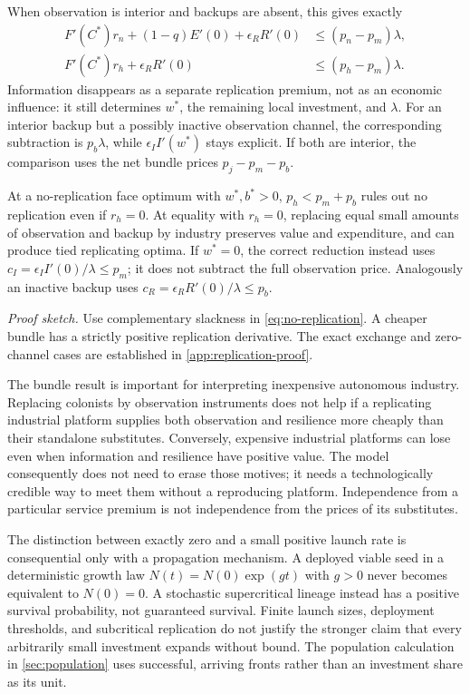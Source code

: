 When observation is interior and backups are absent, this gives exactly
\begin{align}
 F'(C^*)r_n+(1-q)E'(0)+\epsilon_RR'(0)&\leq(p_n-p_m)\lambda,\nonumber\\
 F'(C^*)r_h+\epsilon_RR'(0)&\leq(p_h-p_m)\lambda.
 \label{eq:observation-net}
\end{align}
Information disappears as a separate replication premium, not as an
economic influence: it still determines $w^*$, the remaining local
investment, and $\lambda$. For an interior backup but a possibly inactive
observation channel, the corresponding subtraction is $p_b\lambda$, while
$\epsilon_II'(w^*)$ stays explicit. If both are interior, the comparison
uses the net bundle prices $p_j-p_m-p_b$.

\begin{corollary}
\label{cor:bundle}
At a no-replication face optimum with $w^*,b^*>0$, $p_h<p_m+p_b$
rules out no replication even if $r_h=0$. At equality with $r_h=0$,
replacing equal small amounts of observation and backup by industry
preserves value and expenditure, and can produce tied replicating optima.
If $w^*=0$, the correct reduction instead uses
$c_I=\epsilon_II'(0)/\lambda\leq p_m$; it does not subtract the full
observation price. Analogously an inactive backup uses
$c_R=\epsilon_RR'(0)/\lambda\leq p_b$.
\end{corollary}
\noindent\emph{Proof sketch.}
Use complementary slackness in \cref{eq:no-replication}. A cheaper bundle
has a strictly positive replication derivative. The exact exchange and
zero-channel cases are established in \cref{app:replication-proof}.

The bundle result is important for interpreting inexpensive autonomous
industry. Replacing colonists by observation instruments does not help
if a replicating industrial platform supplies both observation and
resilience more cheaply than their standalone substitutes. Conversely,
expensive industrial platforms can lose even when information and
resilience have positive value. The model consequently does not need
to erase those motives; it needs a technologically credible way to meet
them without a reproducing platform. Independence from a particular
service premium is not independence from the prices of its substitutes.

The distinction between exactly zero and a small positive launch rate
is consequential only with a propagation mechanism. A deployed viable
seed in a deterministic growth law $N(t)=N(0)\exp(g t)$ with $g>0$ never
becomes equivalent to $N(0)=0$. A stochastic supercritical lineage instead
has a positive survival probability, not guaranteed survival. Finite
launch sizes, deployment thresholds, and subcritical replication do not
justify the stronger claim that every arbitrarily small investment expands
without bound. The population calculation in \cref{sec:population} uses
successful, arriving fronts rather than an investment share as its unit.


